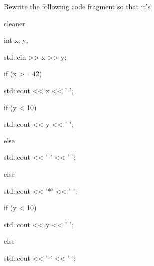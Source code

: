Rewrite the following code fragment so that it's

cleaner

\begin{console}

int x, y;

std::cin >> x >> y;

if (x >= 42)

{

    std::cout << x << ' ';

    if (y < 10)

    {

        std::cout << y << ' ';

    }

    else

    {

        std::cout << '-' << ' ';

    }

}

else

{

     std::cout << '*' << ' ';

     if (y < 10)

     {

        std::cout << y << ' ';

     }

     else

     {

        std::cout << '-' << ' ';

     }

}

\end{console}

